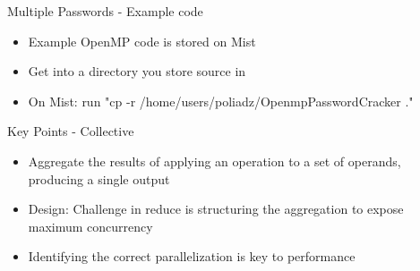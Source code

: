 \documentclass[xcolor=dvipsnames]{beamer}
\begin{document}
	\begin{frame}{Multiple Passwords - Example code}
		\begin{itemize}
      \item Example OpenMP code is stored on Mist
      \item Get into a directory you store source in 
			\item On Mist: run "cp -r /home/users/poliadz/OpenmpPasswordCracker ."
		\end{itemize}
	\end{frame}
  
  \begin{frame}{Key Points - Collective}
		\begin{itemize}
      \item Aggregate the results of applying an operation to a set of operands, producing a single output
      \item Design: Challenge in reduce is structuring the aggregation to expose maximum concurrency
			\item Identifying the correct parallelization is key to performance
		\end{itemize}
	\end{frame}
	
\end{document}
